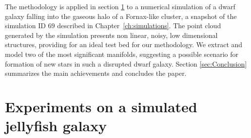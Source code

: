 The methodology is applied in section \ref{sec:Ex_JellyFish} to a numerical simulation of a dwarf galaxy falling into the gaseous halo of a Fornax-like cluster, a snapshot of the simulation ID 69 described in Chapter~\ref{ch:simulations}.
{The point cloud generated by the simulation presents non linear, noisy, low dimensional structures,
providing for an ideal test bed for our methodology.}
We extract and model two of the most significant manifolds, suggesting a possible scenario for formation of new stars in such a disrupted dwarf galaxy.
Section \ref{sec:Conclusion} summarizes the main achievements and concludes the paper.

\section{Experiments on a simulated jellyfish galaxy}\label{sec:Ex_JellyFish}

